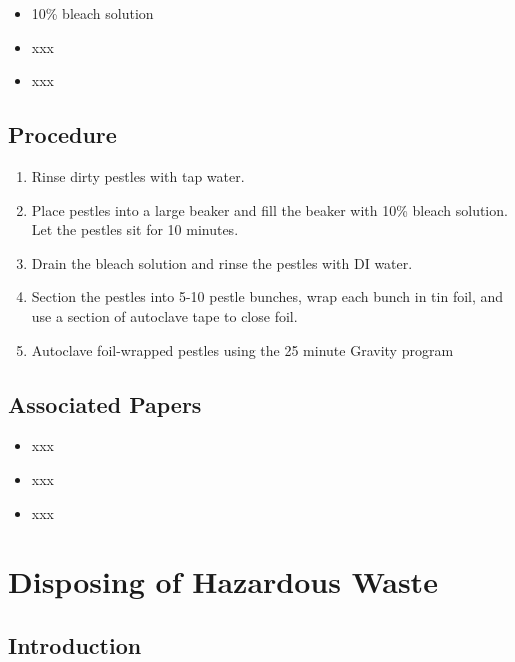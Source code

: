 \documentclass[
  letterpaper,
  DIV=11,
  numbers=noendperiod]{scrreprt}
\providecommand{\tightlist}{%
  \setlength{\itemsep}{0pt}\setlength{\parskip}{0pt}}\usepackage{longtable,booktabs,array}
\begin{document}
\begin{itemize}
\tightlist
\item
  10\% bleach solution
\item
  xxx
\item
  xxx
\end{itemize}

\hypertarget{procedure-2}{%
\section{Procedure}\label{procedure-2}}

\begin{enumerate}
\def\labelenumi{\arabic{enumi}.}
\tightlist
\item
  Rinse dirty pestles with tap water.
\item
  Place pestles into a large beaker and fill the beaker with 10\% bleach
  solution. Let the pestles sit for 10 minutes.
\item
  Drain the bleach solution and rinse the pestles with DI water.
\item
  Section the pestles into 5-10 pestle bunches, wrap each bunch in tin
  foil, and use a section of autoclave tape to close foil.
\item
  Autoclave foil-wrapped pestles using the 25 minute Gravity program
\end{enumerate}

\hypertarget{associated-papers-2}{%
\section{Associated Papers}\label{associated-papers-2}}

\begin{itemize}
\tightlist
\item
  xxx
\item
  xxx
\item
  xxx
\end{itemize}

\hypertarget{sec-general-hazard_waste}{%
\chapter{Disposing of Hazardous Waste}\label{sec-general-hazard_waste}}

\hypertarget{introduction-3}{%
\section{Introduction}\label{introduction-3}}
\end{document}

